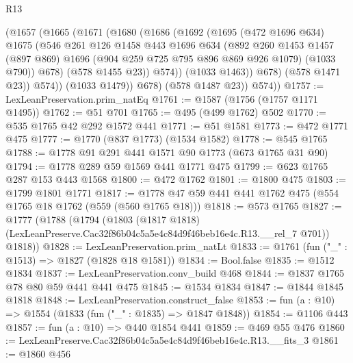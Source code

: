\begin{lexlean}{R13}
\begin{coremodule}
                (@1657
                  (@1665
                    (@1671
                      (@1680
                        (@1686
                          (@1692
                            (@1695
                              (@472 @1696 @634)
                              @1675
                              (@546
                                @261
                                @126
                                @1458
                                @443
                                @1696
                                @634
                                (@892
                                  @260
                                  @1453
                                  @1457
                                  (@897 @869)
                                  @1696
                                  (@904 @259 @725 @795 @896 @869 @926 @1079)
                                  (@1033 @790))
                                @678)
                              (@578 @1455 @23))
                            @574))
                        (@1033 @1463))
                      @678)
                    (@578 @1471 @23))
                  @574))
              (@1033 @1479))
            @678)
          (@578 @1487 @23))
        @574))
@1757 := LexLeanPreservation.prim_natEq
@1761 := @1587 (@1756 (@1757 @1171 @1495))
@1762 := @51 @701
@1765 := @495 (@499 @1762) @502
@1770 := @535 @1765 @42 @292 @1572 @441
@1771 := @51 @1581
@1773 := @472 @1771 @475
@1777 := @1770 (@837 @1773) (@1534 @1582)
@1778 := @545 @1765
@1788 := @1778 @91 @291 @441 @1571 @90 @1773 (@673 @1765 @31 @90)
@1794 := @1778 @289 @59 @1569 @441 @1771 @475
@1799 := @623 @1765 @287 @153 @443 @1568
@1800 := @472 @1762
@1801 := @1800 @475
@1803 := @1799 @1801 @1771
@1817 := @1778 @47 @59 @441 @441 @1762 @475 (@554 @1765 @18 @1762 (@559 (@560 @1765 @18)))
@1818 := @573 @1765
@1827 := @1777
    (@1788
      (@1794
        (@1803 (@1817 @1818) (LexLeanPreserve.Cac32f86b04c5a5e4c84d9f46beb16e4c.R13.__rel_7 @701))
        @1818))
@1828 := LexLeanPreservation.prim_natLt
@1833 := @1761 (fun ("_" : @1513) => @1827 (@1828 @18 @1581))
@1834 := Bool.false
@1835 := @1512 @1834
@1837 := LexLeanPreservation.conv_build @468
@1844 := @1837 @1765 @78 @80 @59 @441 @441 @475
@1845 := @1534 @1834
@1847 := @1844 @1845 @1818
@1848 := LexLeanPreservation.construct_false
@1853 := fun (a : @10) => @1554 (@1833 (fun ("_" : @1835) => @1847 @1848))
@1854 := @1106 @443
@1857 := fun (a : @10) => @440 @1854 @441
@1859 := @469 @55 @476
@1860 := LexLeanPreserve.Cac32f86b04c5a5e4c84d9f46beb16e4c.R13.__fits_3
@1861 := @1860 @456

\end{coremodule}
\end{lexlean}
